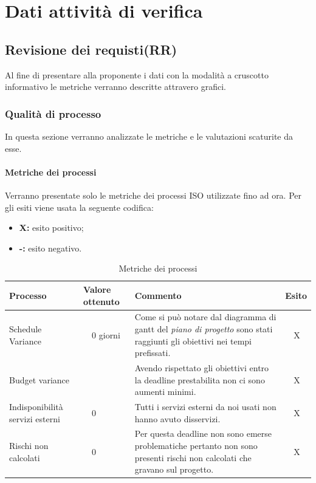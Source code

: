 \section{Dati attività di verifica}
\subsection{Revisione dei requisti(RR)}
Al fine di presentare alla proponente i dati con la modalità a cruscotto informativo le metriche verranno descritte attravero grafici.
\subsubsection{Qualità di processo}
In questa sezione verranno analizzate le metriche e le valutazioni scaturite da esse.
\clearpage
\paragraph{Metriche dei processi}
\hspace{10cm}
\newline Verranno presentate solo le metriche dei processi ISO utilizzate fino ad ora.
Per gli esiti viene usata la seguente codifica:
\begin{itemize}
	\item \textbf{X: } esito positivo;
	\item \textbf{-: } esito negativo.
\end{itemize}
\begin{table}[!htbp]
	\centering
	\renewcommand{\arraystretch}{2} 
	\begin{tabular}{|l|p{2cm}|p{7cm}|l|}
		\rowcolor{orange!50}
		\hline
		\textbf{Processo} & \textbf{Valore ottenuto} & \textbf{Commento} & \textbf{Esito} \\
		\hline
		Schedule Variance & ~~0 giorni & Come si può notare dal diagramma di gantt del \textit{piano di progetto} sono stati raggiunti gli obiettivi nei tempi prefissati. & ~~X \\
		\hline
		Budget variance & ~~\EUR{ -5} & Avendo rispettato gli obiettivi entro la deadline prestabilita non ci sono aumenti minimi. &  ~~X \\
		\hline
		{Indisponibilità servizi esterni} & ~~0 & Tutti i servizi esterni da noi usati non hanno avuto disservizi.  & ~~X\\
		\hline
		Rischi non calcolati & ~~0 & Per questa deadline non sono emerse problematiche pertanto non sono presenti rischi non calcolati che gravano sul progetto. & ~~X\\
		\hline
	\end{tabular}
	\caption{Metriche dei processi}
\end{table}
\clearpage
